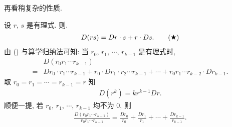 再看稍复杂的性质.

\begin{proposition}
    设 $r$, $s$ 是有理式. 则.
    \begin{align*}
        D(rs) = Dr \cdot s + r \cdot Ds. \tag*{(\ding{72})}
    \end{align*}
    由 () 与算学归纳法可知: 当 $r_0$, $r_1$, $\cdots$, $r_{k-1}$ 是有理式时,
    \begin{align*}
             & D(r_0 r_1 \cdots r_{k-1})                                                                                                 \\
        = {} & Dr_0 \cdot r_1 \cdots r_{k-1} + r_0 \cdot Dr_1 \cdot r_2 \cdots r_{k-1} + \cdots + r_0 r_1 \cdots r_{k-2} \cdot Dr_{k-1}.
    \end{align*}
    取 $r_0 = r_1 = \cdots = r_{k-1} = r$ 知
    \begin{align*}
        D(r^k) = kr^{k-1} Dr.
    \end{align*}
    顺便一提, 若 $r_0$, $r_1$, $\cdots$, $r_{k-1}$ 均不为 $0$, 则
    \begin{align*}
        \frac{D(r_0 r_1 \cdots r_{k-1})}{r_0 r_1 \cdots r_{k-1}} = \frac{Dr_0}{r_0} + \frac{Dr_1}{r_1} + \cdots + \frac{Dr_{k-1}}{r_{k-1}}.
    \end{align*}
\end{proposition}

